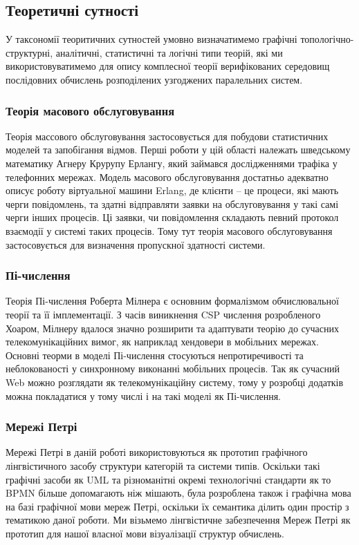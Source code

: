 \documentclass[11pt,oneside]{article}
\begin{document}
\newpage
\subsection{Теоретичні сутності}
\vspace{0.5cm}
   У таксономії теоритичних сутностей умовно визначатимемо
   графічні топологічно- структурні, аналітичні, статистичні та логічні типи теорій, які
   ми використовуватимемо для опису комплесної теорії верифікованих середовищ
   послідовних обчислень розподілених узгоджених паралельних систем.\\

   \subsubsection*{Теорія масового обслуговування}
   Теорія массового обслуговування застосовується для побудови
   статистичних моделей та запобігання відмов. Перші роботи у цій області
   належать шведському математику Агнеру Крурупу Ерлангу, який займався
   дослідженнями трафіка у телефонних мережах. Модель масового обслуговування достатньо
   адекватно описує роботу віртуальної машини Erlang, де клієнти -- це процеси,
   які мають черги повідомлень, та здатні відправляти заявки на обслуговування
   у такі самі черги інших процесів. Ці заявки, чи повідомлення складають певний
   протокол взаємодії у системі таких процесів. Тому тут теорія масового обслуговування
   застосовується для визначення пропускної здатності системи.

   \subsubsection*{Пі-числення}
   Теорія Пі-числення Роберта Мілнера є основним формалізмом обчислювальної
   теорії та її імплементації. З часів виникнення CSP числення розробленого Хоаром,
   Мілнеру вдалося значно розширити та адаптувати теорію до сучасних
   телекомунікаційних вимог, як наприклад хендовери в мобільних мережах.
   Основні теорми в моделі Пі-числення стосуються непротиречивості та неблокованості
   у синхронному виконанні мобільних процесів. Так як сучасний Web можно розглядати
   як телекомунікаційну систему, тому у розробці додатків можна покладатися у тому
   числі і на такі моделі як Пі-числення.

   \subsubsection*{Мережі Петрі}
   Мережі Петрі в даній роботі використовуються як прототип графічного
   лінгвістичного засобу структури категорій та системи типів. Оскільки
   такі графічні засоби як UML та різноманітні окремі технологічні
   стандарти як то BPMN більше допомагають ніж мішають, була розроблена
   також і графічна мова на базі графічної мови мереж Петрі, оскільки їх
   семантика ділить один простір з тематикою даної роботи. Ми візьмемо
   лінгвістичне забезпечення Мереж Петрі як прототип для нашої власної
   мови візуалізації структур обчислень.
\end{document}
